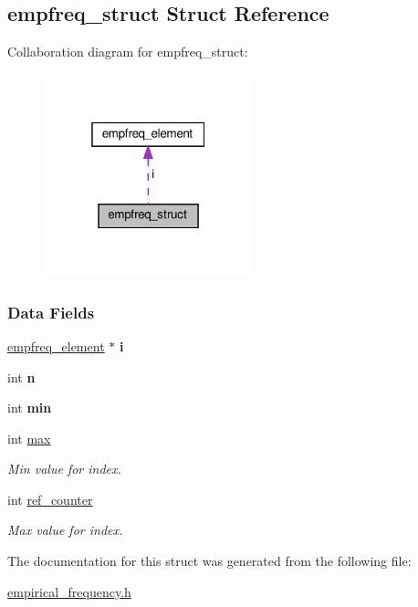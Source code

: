 \hypertarget{structempfreq__struct}{}\subsection{empfreq\+\_\+struct Struct Reference}
\label{structempfreq__struct}


Collaboration diagram for empfreq\+\_\+struct\+:\nopagebreak
\begin{figure}[H]
\begin{center}
\leavevmode
\includegraphics[width=172pt]{structempfreq__struct__coll__graph}
\end{center}
\end{figure}
\subsubsection*{Data Fields}
\begin{DoxyCompactItemize}
\item 
\mbox{\label{structempfreq__struct_aea7241e874e94494faf7d65c878a571a}} 
\hyperlink{structempfreq__element}{empfreq\+\_\+element} $\ast$ {\bfseries i}
\item 
\mbox{\label{structempfreq__struct_a20ee3e8d0078c8022f9201a1218ae495}} 
int {\bfseries n}
\item 
\mbox{\label{structempfreq__struct_a68c162ae0fc46fe35b6d2510e0e0dc49}} 
int {\bfseries min}
\item 
\mbox{\label{structempfreq__struct_a8ab2ef9078903277e65b7bf4ff611c2c}} 
int \hyperlink{structempfreq__struct_a8ab2ef9078903277e65b7bf4ff611c2c}{max}
\begin{DoxyCompactList}\small\item\em Min value for index. \end{DoxyCompactList}\item 
\mbox{\label{structempfreq__struct_ac3ad72cff1347a06116940f7f9a85b4e}} 
int \hyperlink{structempfreq__struct_ac3ad72cff1347a06116940f7f9a85b4e}{ref\+\_\+counter}
\begin{DoxyCompactList}\small\item\em Max value for index. \end{DoxyCompactList}\end{DoxyCompactItemize}


The documentation for this struct was generated from the following file\+:\begin{DoxyCompactItemize}
\item 
\hyperlink{empirical__frequency_8h}{empirical\+\_\+frequency.\+h}\end{DoxyCompactItemize}
